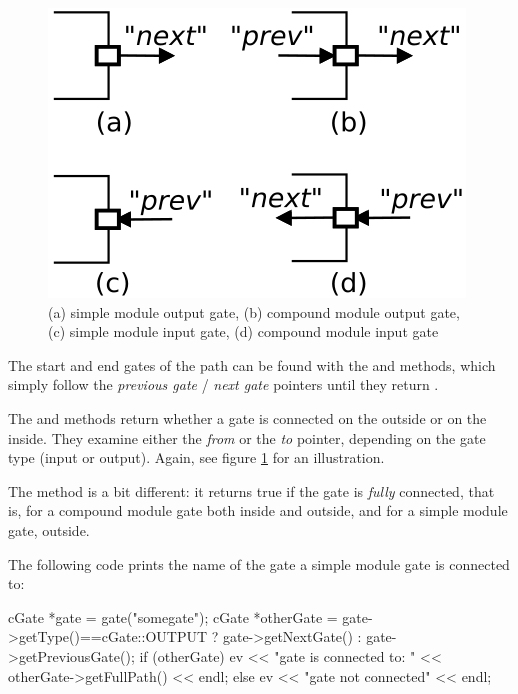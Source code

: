 \begin{figure}[htbp]
\begin{center}
\includegraphics{figures/simple-gates}
\caption{(a) simple module output gate, (b) compound module output gate,
         (c) simple module input gate, (d) compound module input gate}
\label{fig:ch-simple-modules:gates}
\end{center}
\end{figure}

The start and end gates of the path can be found with the 
and  methods, which simply follow the \textit{previous gate} /
\textit{next gate} pointers until they return .

The  and  methods
return whether a gate is connected on the outside or on the inside. They
examine either the \textit{from} or the \textit{to} pointer, depending on the
gate type (input or output). Again, see figure \ref{fig:ch-simple-modules:gates}
for an illustration.

The  method is a bit different: it returns true if the gate
is \textit{fully} connected, that is, for a compound module gate
both inside and outside, and for a simple module gate, outside.

The following code prints the name of the gate a simple module gate is
connected to:

\begin{cpp}
cGate *gate = gate("somegate");
cGate *otherGate = gate->getType()==cGate::OUTPUT ? gate->getNextGate() :
                                                    gate->getPreviousGate();
if (otherGate)
  ev << "gate is connected to: " << otherGate->getFullPath() << endl;
else
  ev << "gate not connected" << endl;
\end{cpp}



